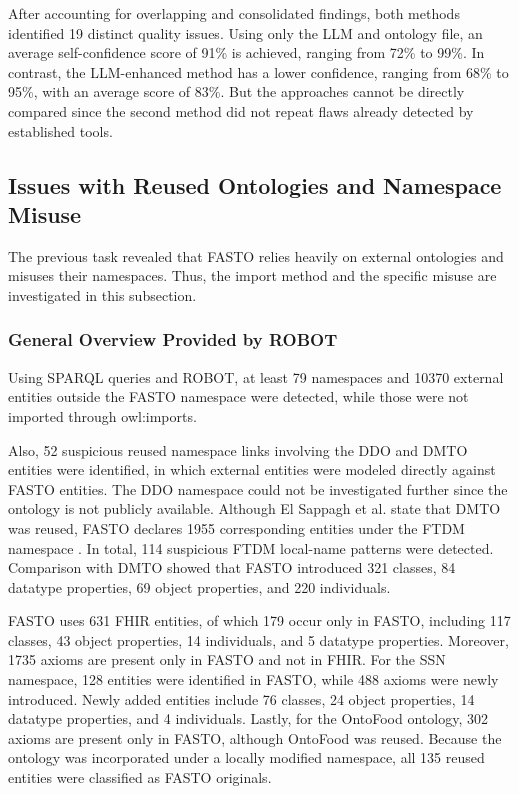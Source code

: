 \documentclass[
]{ceurart}
\begin{document}
After accounting for overlapping and consolidated findings, both methods identified 19 distinct quality issues. Using only the LLM and ontology file, an average self-confidence score of 91\% is achieved, ranging from 72\% to 99\%. In contrast, the LLM-enhanced method has a lower confidence, ranging from 68\% to 95\%, with an average score of 83\%. But the approaches cannot be directly compared since the second method did not repeat flaws already detected by established tools. 


\subsection{Issues with Reused Ontologies and Namespace Misuse}

The previous task revealed that FASTO relies heavily on external ontologies and misuses their namespaces. Thus, the import method and the specific misuse are investigated in this subsection. 

\subsubsection{General Overview Provided by ROBOT}

Using SPARQL queries and ROBOT, at least 79 namespaces and 10370 external entities outside the FASTO namespace were detected, while those were not imported through owl:imports. 

Also, 52 suspicious reused namespace links involving the DDO and DMTO entities were identified, in which external entities were modeled directly against FASTO entities. The DDO namespace could not be investigated further since the ontology is not publicly available. Although El Sappagh et al. state that DMTO was reused, FASTO declares 1955 corresponding entities under the FTDM namespace \cite{ElSappagh2019_FASTO}. In total, 114 suspicious FTDM local-name patterns were detected. Comparison with DMTO showed that FASTO introduced 321 classes, 84 datatype properties, 69 object properties, and 220 individuals.

FASTO uses 631 FHIR entities, of which 179 occur only in FASTO, including 117 classes, 43 object properties, 14 individuals, and 5 datatype properties. Moreover, 1735 axioms are present only in FASTO and not in FHIR. For the SSN namespace, 128 entities were identified in FASTO, while 488 axioms were newly introduced. Newly added entities include 76 classes, 24 object properties, 14 datatype properties, and 4 individuals. Lastly, for the OntoFood ontology, 302 axioms are present only in FASTO, although OntoFood was reused. Because the ontology was incorporated under a locally modified namespace, all 135 reused entities were classified as FASTO originals.
\end{document}
